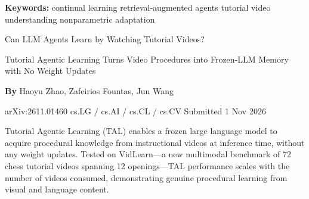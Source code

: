 \documentclass[10pt,twocolumn]{article}
\begin{document}
\setlength{\parindent}{0pt}
\setlength{\parskip}{4pt}

{\small\color{keywordgray}\textbf{Keywords:}
  continual learning \textbullet{}
  retrieval-augmented agents \textbullet{}
  tutorial video understanding \textbullet{}
  nonparametric adaptation}\par\vspace{4pt}

{\LARGE\bfseries\raggedright
  Can LLM Agents Learn by Watching Tutorial Videos?}\par\vspace{4pt}

{\large\itshape\raggedright
  Tutorial Agentic Learning Turns Video Procedures into Frozen-LLM Memory
  with No Weight Updates}\par\vspace{6pt}

{\small\textbf{By} Haoyu Zhao, Zafeirios Fountas, Jun Wang}\par\vspace{2pt}

{\small\color{keywordgray}arXiv:2611.01460 \textbullet{}
  cs.LG / cs.AI / cs.CL / cs.CV \textbullet{} Submitted 1 Nov 2026}
\par\vspace{2pt}\noindent{\color{rulered}\rule{\columnwidth}{0.6pt}}\vspace{6pt}

Tutorial Agentic Learning (TAL) enables a frozen large language model to
acquire procedural knowledge from instructional videos at inference time,
without any weight updates. Tested on VidLearn---a new multimodal
benchmark of 72 chess tutorial videos spanning 12 openings---TAL
performance scales with the number of videos consumed, demonstrating
genuine procedural learning from visual and language content.
\end{document}
